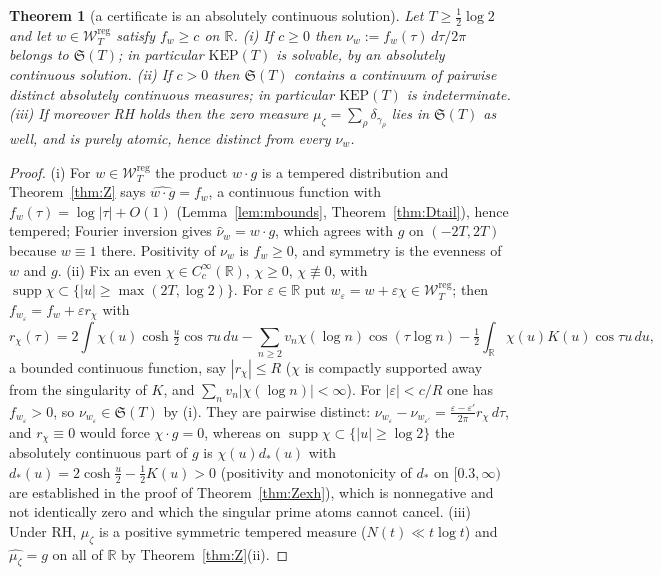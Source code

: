 \documentclass[11pt]{amsart}
\newtheorem{theorem}{Theorem}[section]
\theoremstyle{definition}
\theoremstyle{remark}
\newcommand{\R}{\mathbb R}
\newcommand{\supp}{\operatorname{supp}}
\newcommand{\nuh}{\widehat\nu}
\newcommand{\Wcl}{\mathcal W_T}
\begin{document}
\begin{theorem}[a certificate is an absolutely continuous solution]\label{thm:KEP1}
Let $T\ge\frac12\log2$ and let $w\in\Wcl^{\mathrm{reg}}$ satisfy $f_w\ge c$ on $\R$.
\emph{(i)} If $c\ge0$ then $\nu_w:=f_w(\tau)\,d\tau/2\pi$ belongs to $\mathfrak S(T)$; in particular
$\mathrm{KEP}(T)$ is solvable, by an absolutely continuous solution.
\emph{(ii)} If $c>0$ then $\mathfrak S(T)$ contains a continuum of pairwise distinct absolutely
continuous measures; in particular $\mathrm{KEP}(T)$ is indeterminate.
\emph{(iii)} If moreover RH holds then the zero measure $\mu_\zeta=\sum_\rho\delta_{\gamma_\rho}$
lies in $\mathfrak S(T)$ as well, and is purely atomic, hence distinct from every $\nu_w$.
\end{theorem}
\begin{proof}
(i) For $w\in\Wcl^{\mathrm{reg}}$ the product $w\cdot g$ is a tempered distribution and
Theorem~\ref{thm:Z} says $\widehat{w\cdot g}=f_w$, a continuous function with
$f_w(\tau)=\log|\tau|+O(1)$ (Lemma~\ref{lem:mbounds}, Theorem~\ref{thm:Dtail}), hence tempered;
Fourier inversion gives $\nuh_w=w\cdot g$, which agrees with $g$ on $(-2T,2T)$ because $w\equiv1$
there. Positivity of $\nu_w$ is $f_w\ge0$, and symmetry is the evenness of $w$ and $g$.
(ii) Fix an even $\chi\in C_c^\infty(\R)$, $\chi\ge0$, $\chi\not\equiv0$, with
$\supp\chi\subset\{|u|\ge\max(2T,\log2)\}$. For $\varepsilon\in\R$ put $w_\varepsilon=w+\varepsilon\chi
\in\Wcl^{\mathrm{reg}}$; then $f_{w_\varepsilon}=f_w+\varepsilon r_\chi$ with
\[
r_\chi(\tau)=2\int\chi(u)\cosh\tfrac u2\cos\tau u\,du-\sum_{n\ge2}v_n\chi(\log n)\cos(\tau\log n)
-\tfrac12\int_\R\chi(u)K(u)\cos\tau u\,du ,
\]
a bounded continuous function, say $|r_\chi|\le R$ ($\chi$ is compactly supported away from the
singularity of $K$, and $\sum_nv_n|\chi(\log n)|<\infty$). For $|\varepsilon|<c/R$ one has
$f_{w_\varepsilon}>0$, so $\nu_{w_\varepsilon}\in\mathfrak S(T)$ by (i). They are pairwise distinct:
$\nu_{w_\varepsilon}-\nu_{w_{\varepsilon'}}=\frac{\varepsilon-\varepsilon'}{2\pi}r_\chi\,d\tau$, and
$r_\chi\equiv0$ would force $\chi\cdot g=0$, whereas on $\supp\chi\subset\{|u|\ge\log2\}$ the
absolutely continuous part of $g$ is $\chi(u)d_*(u)$ with $d_*(u)=2\cosh\frac u2-\frac12K(u)>0$
(positivity and monotonicity of $d_*$ on $[0.3,\infty)$ are established in the proof of
Theorem~\ref{thm:Zexh}), which is nonnegative and not identically zero and which the singular prime
atoms cannot cancel.
(iii) Under RH, $\mu_\zeta$ is a positive symmetric tempered measure ($N(t)\ll t\log t$) and
$\widehat{\mu_\zeta}=g$ on all of $\R$ by Theorem~\ref{thm:Z}(ii).
\end{proof}
\end{document}
